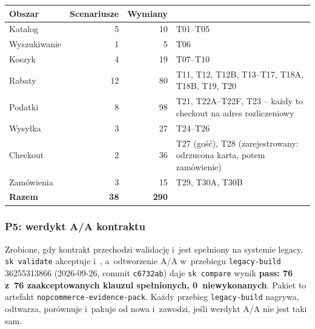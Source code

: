 \begin{center}
\small
\begin{tabularx}{\linewidth}{@{}l r r X@{}}
\toprule
Obszar & Scenariusze & Wymiany & \\
\midrule
Katalog & 5 & 10 & T01--T05 \\
Wyszukiwanie & 1 & 5 & T06 \\
Koszyk & 4 & 19 & T07--T10 \\
Rabaty & 12 & 80 & T11, T12, T12B, T13--T17, T18A, T18B, T19, T20 \\
Podatki & 8 & 98 & T21, T22A--T22F, T23 -- każdy to checkout na adres rozliczeniowy \\
Wysyłka & 3 & 27 & T24--T26 \\
Checkout & 2 & 36 & T27 (gość), T28 (zarejestrowany: odrzucona karta, potem zamówienie) \\
Zamówienia & 3 & 15 & T29, T30A, T30B \\
\midrule
\textbf{Razem} & \textbf{38} & \textbf{290} & \\
\bottomrule
\end{tabularx}
\end{center}


\subsubsection{P5: werdykt A/A kontraktu}\label{sec:bench-wyniki-p5}

Zrobione, gdy kontrakt przechodzi walidację i~jest spełniony na systemie legacy.
\texttt{sk validate} akceptuje  i~, a~odtworzenie
A/A w~przebiegu \texttt{legacy-build} 36255313866 (2026-09-26, commit \texttt{c6732ab})
daje \texttt{sk compare} wynik \textbf{pass: 76 z~76 zaakceptowanych klauzul spełnionych,
0~niewykonanych}. Pakiet to artefakt \texttt{nopcommerce-evidence-pack}. Każdy przebieg
\texttt{legacy-build} nagrywa, odtwarza, porównuje i~pakuje od nowa i~zawodzi, jeśli werdykt
A/A nie jest taki sam.


